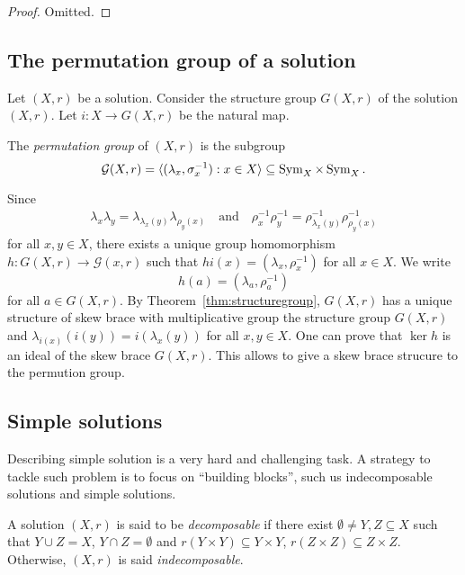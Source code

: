     \begin{proof}
        Omitted.
    \end{proof}

    \subsection{The permutation group of a solution}

    Let $(X,r)$ be a solution. Consider the structure group $G(X,r)$ of the solution $(X,r)$. Let $i\colon X\to G(X,r)$ be the natural map. 

    The \emph{permutation group} of $(X,r)$ is the subgroup
    \[\mathcal{G}(X,r)=\langle (\lambda_x,\sigma^{-1}_x) : x\in X\rangle\subseteq\operatorname{Sym}_X\times\operatorname{Sym}_X.\]
    
    Since 
    \begin{align*}
        \lambda_x\lambda_y=\lambda_{\lambda_x(y)}\lambda_{\rho_y(x)}\quad\text{and}\quad \rho^{-1}_x\rho^{-1}_y=\rho^{-1}_{\lambda_x(y)}\rho^{-1}_{\rho_y(x)}
    \end{align*}
    for all $x,y\in X$, there exists a unique group homomorphism
    $h\colon G(X,r)\to \mathcal{G}(x,r)$ such that $hi(x)=(\lambda_x,\rho^{-1}_x)$ for all $x\in X$. We write
    \[ h(a)=(\lambda_a,\rho_a^{-1})\]
    for all $a\in G(X,r)$.
    By Theorem~\ref{thm:structuregroup}, $G(X,r)$ has a unique structure of skew brace with multiplicative group the structure group $G(X,r)$ and $\lambda_{i(x)}(i(y))=i(\lambda_x(y))$ for all $x,y\in X$. One can prove that $\ker h$ is an ideal of the skew brace $G(X,r)$. This allows to give a skew brace strucure to the permution group.

\subsection{Simple solutions}

Describing simple solution is a very hard and challenging task. A strategy to tackle such problem is to focus on ``building blocks'', such us indecomposable solutions and simple solutions. 

\begin{definition}
    A solution $(X,r)$ is said to be \emph{decomposable} if there exist $\emptyset \neq Y,Z \subseteq X$ such that $Y\cup Z = X$, $Y \cap Z = \emptyset$ and $r(Y\times Y)\subseteq Y\times Y$, $r(Z\times Z)\subseteq Z \times Z$. Otherwise, $(X,r)$ is said \emph{indecomposable}.
\end{definition}

